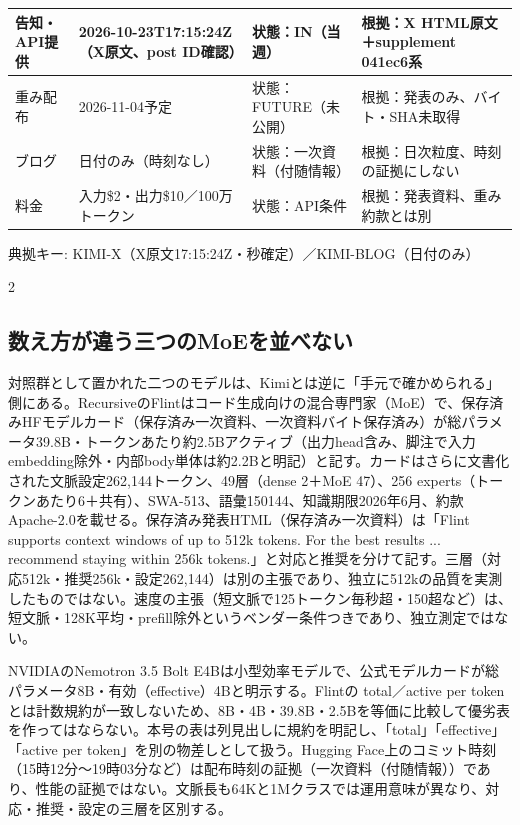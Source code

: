 \documentclass[lualatex,a4paper,10pt]{jlreq}
\begin{document}
{\centering\footnotesize
{}
\begin{tabularx}{0.96\linewidth}{@{}lXXX@{}}
\toprule
告知・API提供 & 2026-10-23T17:15:24Z（X原文、post ID確認） & 状態：IN（当週） & 根拠：X HTML原文＋supplement 041ec6系 \\
\midrule
重み配布 & 2026-11-04予定 & 状態：FUTURE（未公開） & 根拠：発表のみ、バイト・SHA未取得 \\
ブログ & 日付のみ（時刻なし） & 状態：一次資料（付随情報） & 根拠：日次粒度、時刻の証拠にしない \\
料金 & 入力\$2・出力\$10／100万トークン & 状態：API条件 & 根拠：発表資料、重み約款とは別 \\
\bottomrule
\end{tabularx}
{\scriptsize\color{SurveyMuted} 典拠キー: KIMI-X（X原文17:15:24Z・秒確定）／KIMI-BLOG（日付のみ）\par}
} %
\begin{multicols}{2} %


\subsection*{数え方が違う三つのMoEを並べない}


対照群として置かれた二つのモデルは、Kimiとは逆に「手元で確かめられる」側にある。RecursiveのFlintはコード生成向けの混合専門家（MoE）で、保存済みHFモデルカード（保存済み一次資料、一次資料バイト保存済み）が総パラメータ39.8B・トークンあたり約2.5Bアクティブ（出力head含み、脚注で入力embedding除外・内部body単体は約2.2Bと明記）と記す。カードはさらに文書化された文脈設定262,144トークン、49層（dense 2＋MoE 47）、256 experts（トークンあたり6＋共有）、SWA-513、語彙150144、知識期限2026年6月、約款Apache-2.0を載せる。保存済み発表HTML（保存済み一次資料）は「Flint supports context windows of up to 512k tokens. For the best results ... recommend staying within 256k tokens.」と対応と推奨を分けて記す。三層（対応512k・推奨256k・設定262,144）は別の主張であり、独立に512kの品質を実測したものではない。速度の主張（短文脈で125トークン毎秒超・150超など）は、短文脈・128K平均・prefill除外というベンダー条件つきであり、独立測定ではない。


NVIDIAのNemotron 3.5 Bolt E4Bは小型効率モデルで、公式モデルカードが総パラメータ8B・有効（effective）4Bと明示する。Flintの total／active per token とは計数規約が一致しないため、8B・4B・39.8B・2.5Bを等価に比較して優劣表を作ってはならない。本号の表は列見出しに規約を明記し、「total」「effective」「active per token」を別の物差しとして扱う。Hugging Face上のコミット時刻（15時12分～19時03分など）は配布時刻の証拠（一次資料（付随情報））であり、性能の証拠ではない。文脈長も64Kと1Mクラスでは運用意味が異なり、対応・推奨・設定の三層を区別する。


\end{multicols} %
\end{document}
